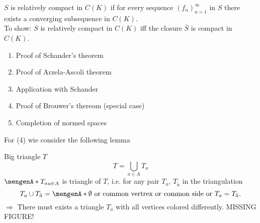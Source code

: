 $S$ is relatively compact in $C(K)$ if for every sequence $(f_n)_{n=1}^{\infty}$ in $S$ there exists a converging subsequence in $C(K)$. \\
To show:
$S$ is relatively compact in $C(K)$ iff the closure $\bar{S}$ is compact in $C(K)$. 
\begin{enumerate}[(1)]
	\item Proof of Schander's theorem
	\item Proof of Arzela-Ascoli theorem
	\item Application with Schander
	\item Proof of Brouwer's thereom (special case)
	\item Completion of normed spaces
\end{enumerate}	
For (4) wie consider the following lemma
\begin{lemma}
	Big triangle $T$ 
	\[
		T = \bigcup_{a \in A} T_a
	\]
	$\set{T_a}_{a \in A}$ is triangle of $T$, i.e. for any pair $T_a$, $T_{\tilde a}$ in the triangulation
	\[
		T_a \cup T_{\tilde a}= \set{\emptyset \text{ or common vertrex or common side or }T_a = T_{\tilde a}}.
	\]
	$\Rightarrow $ There must exists a triangle $T_a$ with all vertices colored differently. MISSING FIGURE!
\end{lemma}

